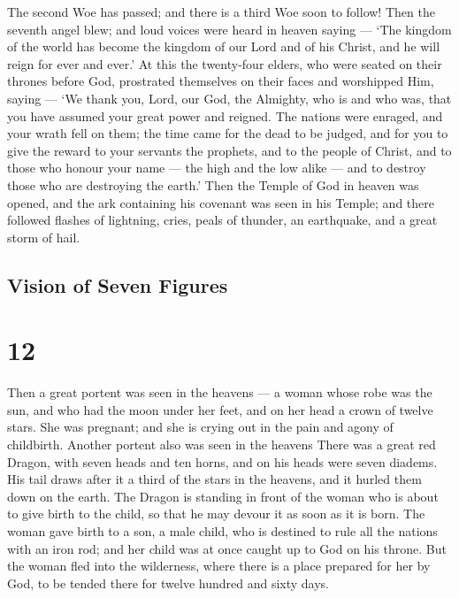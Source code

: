  The second Woe has passed; and there is a third Woe soon
to follow!  Then the seventh angel blew; and loud voices
were heard in heaven saying --- `The kingdom of the world has become the
kingdom of our Lord and of his Christ, and he will reign for ever and
ever.'  At this the twenty-four elders, who were seated on
their thrones before God, prostrated themselves on their faces and
worshipped Him,  saying --- `We thank you, Lord, our God,
the Almighty, who is and who was, that you have assumed your great power
and reigned.  The nations were enraged, and your wrath fell
on them; the time came for the dead to be judged, and for you to give
the reward to your servants the prophets, and to the people of Christ,
and to those who honour your name --- the high and the low alike --- and
to destroy those who are destroying the earth.'  Then the
Temple of God in heaven was opened, and the ark containing his covenant
was seen in his Temple; and there followed flashes of lightning, cries,
peals of thunder, an earthquake, and a great storm of hail.

\hypertarget{vision-of-seven-figures}{%
\subsection{Vision of Seven Figures}\label{vision-of-seven-figures}}

\hypertarget{section-11}{%
\section{12}\label{section-11}}

 Then a great portent was seen in the heavens --- a woman
whose robe was the sun, and who had the moon under her feet, and on her
head a crown of twelve stars.  She was pregnant; and she is
crying out in the pain and agony of childbirth.  Another
portent also was seen in the heavens There was a great red Dragon, with
seven heads and ten horns, and on his heads were seven diadems.
 His tail draws after it a third of the stars in the
heavens, and it hurled them down on the earth. The Dragon is standing in
front of the woman who is about to give birth to the child, so that he
may devour it as soon as it is born.  The woman gave birth
to a son, a male child, who is destined to rule all the nations with an
iron rod; and her child was at once caught up to God on his throne.
 But the woman fled into the wilderness, where there is a
place prepared for her by God, to be tended there for twelve hundred and
sixty days.

